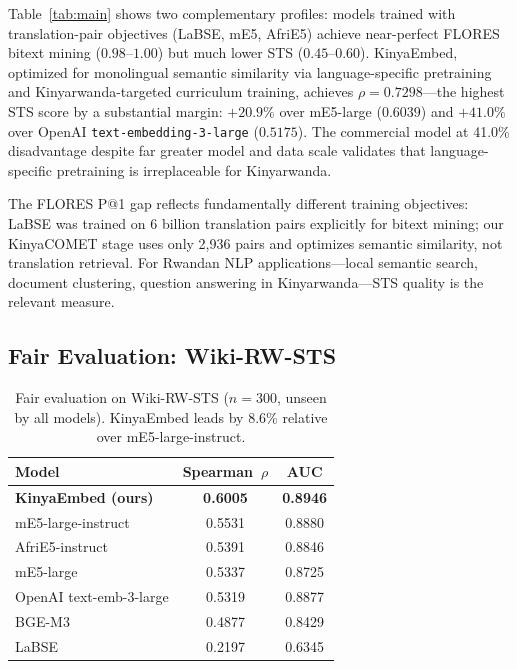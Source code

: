 \documentclass[letterpaper]{article} %
\begin{document}
Table~\ref{tab:main} shows two complementary profiles: models trained with
translation-pair objectives (LaBSE, mE5, AfriE5) achieve near-perfect FLORES
bitext mining ($0.98$--$1.00$) but much lower STS ($0.45$--$0.60$).
KinyaEmbed, optimized for monolingual semantic similarity via language-specific
pretraining and Kinyarwanda-targeted curriculum training, achieves
$\rho = 0.7298$---the highest STS score by a substantial margin: $+20.9\%$
over mE5-large ($0.6039$) and $+41.0\%$ over OpenAI \texttt{text-embedding-3-large}
($0.5175$). The commercial model at 41.0\% disadvantage despite far greater
model and data scale validates that language-specific pretraining is
irreplaceable for Kinyarwanda.

The FLORES P@1 gap reflects fundamentally different training objectives:
LaBSE was trained on 6 billion translation pairs explicitly for bitext
mining; our KinyaCOMET stage uses only 2{,}936 pairs and optimizes semantic
similarity, not translation retrieval. For Rwandan NLP applications---local
semantic search, document clustering, question answering in Kinyarwanda---STS
quality is the relevant measure.

\subsection{Fair Evaluation: Wiki-RW-STS}

\begin{table}[t]
\centering
\small
\begin{tabular}{lcc}
\toprule
\textbf{Model}                  & \textbf{Spearman~$\rho$} & \textbf{AUC} \\
\midrule
\textbf{KinyaEmbed (ours)}      & \textbf{0.6005}          & \textbf{0.8946} \\
mE5-large-instruct              & 0.5531                   & 0.8880 \\
AfriE5-instruct                 & 0.5391                   & 0.8846 \\
mE5-large                       & 0.5337                   & 0.8725 \\
OpenAI text-emb-3-large         & 0.5319                   & 0.8877 \\
BGE-M3                          & 0.4877                   & 0.8429 \\
LaBSE                           & 0.2197                   & 0.6345 \\
\bottomrule
\end{tabular}
\caption{Fair evaluation on Wiki-RW-STS ($n=300$, unseen by all models).
KinyaEmbed leads by 8.6\% relative over mE5-large-instruct.}
\label{tab:fair}
\end{table}
\end{document}
